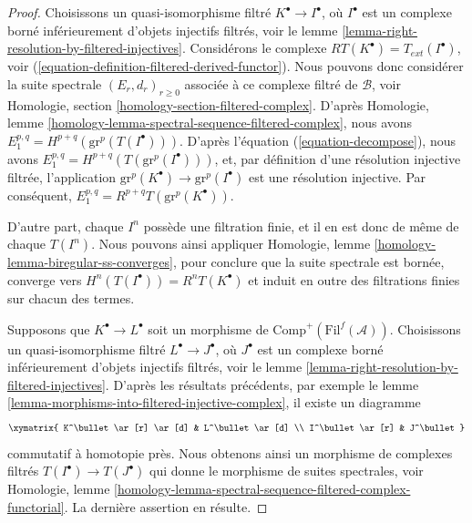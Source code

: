 \begin{proof}
Choisissons un quasi-isomorphisme filtré $K^\bullet \to I^\bullet$, où
$I^\bullet$ est un complexe borné inférieurement d'objets injectifs filtrés,
voir le lemme \ref{lemma-right-resolution-by-filtered-injectives}.
Considérons le complexe $RT(K^\bullet) = T_{ext}(I^\bullet)$, voir
(\ref{equation-definition-filtered-derived-functor}).
Nous pouvons donc considérer la suite spectrale
$(E_r, d_r)_{r \geq 0}$ associée à ce complexe filtré de $\mathcal{B}$, voir
Homologie, section \ref{homology-section-filtered-complex}.
D'après Homologie, lemme
\ref{homology-lemma-spectral-sequence-filtered-complex}, nous avons
$E_1^{p, q} = H^{p + q}(\text{gr}^p(T(I^\bullet)))$.
D'après l'équation (\ref{equation-decompose}), nous avons
$E_1^{p, q} = H^{p + q}(T(\text{gr}^p(I^\bullet)))$, et, par définition d'une
résolution injective filtrée, l'application
$\text{gr}^p(K^\bullet) \to \text{gr}^p(I^\bullet)$ est une résolution
injective. Par conséquent,
$E_1^{p, q} = R^{p + q}T(\text{gr}^p(K^\bullet))$.

\medskip\noindent
D'autre part, chaque $I^n$ possède une filtration finie, et il en est donc de
même de chaque $T(I^n)$. Nous pouvons ainsi appliquer Homologie, lemme
\ref{homology-lemma-biregular-ss-converges}, pour conclure que la suite
spectrale est bornée, converge vers
$H^n(T(I^\bullet)) = R^nT(K^\bullet)$ et induit en outre des filtrations finies sur chacun des termes.

\medskip\noindent
Supposons que $K^\bullet \to L^\bullet$ soit un morphisme de
$\text{Comp}^{+}(\text{Fil}^f(\mathcal{A}))$.
Choisissons un quasi-isomorphisme filtré $L^\bullet \to J^\bullet$, où
$J^\bullet$ est un complexe borné inférieurement d'objets injectifs filtrés,
voir le lemme \ref{lemma-right-resolution-by-filtered-injectives}.
D'après les résultats précédents, par exemple le
lemme \ref{lemma-morphisms-into-filtered-injective-complex}, il existe un
diagramme
$$
\xymatrix{
K^\bullet \ar[r] \ar[d] & L^\bullet \ar[d] \\
I^\bullet \ar[r] & J^\bullet
}
$$
commutatif à homotopie près. Nous obtenons ainsi un morphisme de complexes
filtrés $T(I^\bullet) \to T(J^\bullet)$ qui donne le morphisme de suites
spectrales, voir Homologie, lemme
\ref{homology-lemma-spectral-sequence-filtered-complex-functorial}.
La dernière assertion en résulte.
\end{proof}

